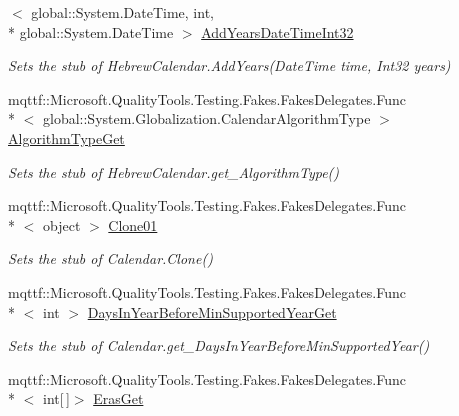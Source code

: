\begin{DoxyCompactItemize}
$<$ global\-::\-System.\-Date\-Time, int, \\*
global\-::\-System.\-Date\-Time $>$ \hyperlink{class_system_1_1_globalization_1_1_fakes_1_1_stub_hebrew_calendar_aa0aa6a62252de379055127666243f633}{Add\-Years\-Date\-Time\-Int32}
\begin{DoxyCompactList}\small\item\em Sets the stub of Hebrew\-Calendar.\-Add\-Years(\-Date\-Time time, Int32 years)\end{DoxyCompactList}\item 
mqttf\-::\-Microsoft.\-Quality\-Tools.\-Testing.\-Fakes.\-Fakes\-Delegates.\-Func\\*
$<$ global\-::\-System.\-Globalization.\-Calendar\-Algorithm\-Type $>$ \hyperlink{class_system_1_1_globalization_1_1_fakes_1_1_stub_hebrew_calendar_a146df2272f970e6b3e50fc4a61928b2c}{Algorithm\-Type\-Get}
\begin{DoxyCompactList}\small\item\em Sets the stub of Hebrew\-Calendar.\-get\-\_\-\-Algorithm\-Type()\end{DoxyCompactList}\item 
mqttf\-::\-Microsoft.\-Quality\-Tools.\-Testing.\-Fakes.\-Fakes\-Delegates.\-Func\\*
$<$ object $>$ \hyperlink{class_system_1_1_globalization_1_1_fakes_1_1_stub_hebrew_calendar_a2213a6ac93c33d22b19db3875a9c01e6}{Clone01}
\begin{DoxyCompactList}\small\item\em Sets the stub of Calendar.\-Clone()\end{DoxyCompactList}\item 
mqttf\-::\-Microsoft.\-Quality\-Tools.\-Testing.\-Fakes.\-Fakes\-Delegates.\-Func\\*
$<$ int $>$ \hyperlink{class_system_1_1_globalization_1_1_fakes_1_1_stub_hebrew_calendar_ae33fad6f6c33f2ddb833db9acc478ea7}{Days\-In\-Year\-Before\-Min\-Supported\-Year\-Get}
\begin{DoxyCompactList}\small\item\em Sets the stub of Calendar.\-get\-\_\-\-Days\-In\-Year\-Before\-Min\-Supported\-Year()\end{DoxyCompactList}\item 
mqttf\-::\-Microsoft.\-Quality\-Tools.\-Testing.\-Fakes.\-Fakes\-Delegates.\-Func\\*
$<$ int\mbox{[}$\,$\mbox{]}$>$ \hyperlink{class_system_1_1_globalization_1_1_fakes_1_1_stub_hebrew_calendar_a4b165255eb1896dc0346658536cb4fc0}{Eras\-Get}

\end{DoxyCompactItemize}
